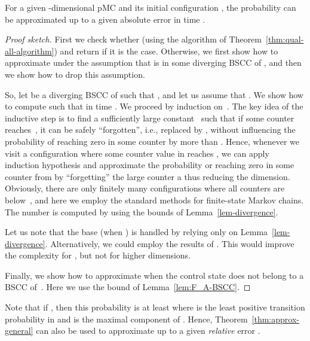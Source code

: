 \begin{theorem}
 \label{thm:approx-general}
 For a given -dimensional pMC  and its initial configuration
 , the probability  can be
 approximated up to a given absolute error  in time
 .
\end{theorem}
\begin{proof}[Proof sketch]
  First we check whether    
  (using the algorithm of Theorem~\ref{thm:qual-all-algorithm}) and 
  return  if it is the case. Otherwise, we first show how
  to approximate  under the 
  assumption that  is in some diverging BSCC of , and 
  then we show how to drop this assumption.

  So, let  be a diverging BSCC of  such that 
  , and let us assume that . 
  We show how to compute  such that 
   in time 
  . We proceed by induction
  on~. The key idea of the inductive step is to find a sufficiently
  large constant~ such that if some counter reaches~, it can
  be safely ``forgotten'', i.e., replaced by , without influencing
  the probability of reaching zero in some counter by more than 
  . Hence, whenever we visit a configuration 
  where some counter value in  reaches , we can
  apply induction hypothesis and approximate the probability or reaching 
  zero in some counter from  by ``forgetting'' the large
  counter a thus reducing the dimension. Obviously, there are only 
  finitely many configurations where all counters are below~, and
  here we employ the standard methods for finite-state Markov chains. 
  The number  is computed by using
  the bounds of Lemma~\ref{lem-divergence}. 

  Let us note that the base (when ) is handled by relying only
  on Lemma~\ref{lem-divergence}. Alternatively, we could employ
  the results of \cite{ESY:polynomial-time-termination}. This would
  improve the complexity for , but not for higher 
  dimensions. 

  Finally, we show how to approximate 
  when the control state  does not belong to a BSCC of~.
  Here we use the bound of Lemma~\ref{lem:F_A-BSCC}.
\end{proof}

Note that if , then this probability is
at least  where  is the least positive
transition probability in  and  is the maximal component 
of . Hence, Theorem~\ref{thm:approx-general} can also be
used to approximate  up to a given
\emph{relative} error .

